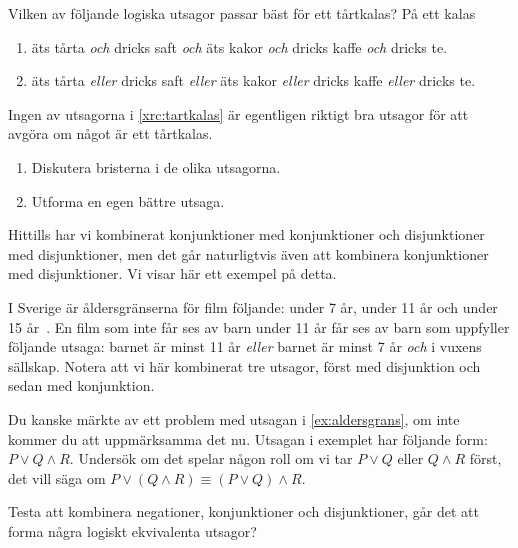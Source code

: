 \begin{exercise}\label{xrc:tartkalas}
  Vilken av följande logiska utsagor passar bäst för ett tårtkalas?
  På ett kalas
  \begin{enumerate}
    \item äts tårta \emph{och} dricks saft \emph{och} äts kakor
      \emph{och} dricks kaffe \emph{och} dricks te.
    \item äts tårta \emph{eller} dricks saft \emph{eller} äts kakor
      \emph{eller} dricks kaffe \emph{eller} dricks te.
  \end{enumerate}
\end{exercise}

\begin{exercise}
  Ingen av utsagorna i \cref{xrc:tartkalas} är egentligen riktigt bra 
  utsagor för att avgöra om något är ett tårtkalas.
  \begin{enumerate}
    \item Diskutera bristerna i de olika utsagorna.
    \item Utforma en egen bättre utsaga.
  \end{enumerate}
\end{exercise}

Hittills har vi kombinerat konjunktioner med konjunktioner och disjunktioner 
med disjunktioner, men det går naturligtvis även att kombinera konjunktioner 
med disjunktioner.
Vi visar här ett exempel på detta.

\begin{example}\label{ex:aldersgrans}
  I Sverige är åldersgränserna för film följande: under 7 år, under 11 år och 
  under 15 år~\cite{aldersgranser}.
  En film som inte får ses av barn under 11 år får ses av barn som uppfyller 
  följande utsaga: barnet är minst 11 år \emph{eller} barnet är minst 7 år 
  \emph{och} i vuxens sällskap.
  Notera att vi här kombinerat tre utsagor, först med disjunktion och sedan med 
  konjunktion.
\end{example}

\begin{exercise}
  Du kanske märkte av ett problem med utsagan i \cref{ex:aldersgrans}, om 
  inte kommer du att uppmärksamma det nu.
  Utsagan i exemplet har följande form: \(P\lor Q\land R\).
  Undersök om det spelar någon roll om vi tar \(P\lor Q\) eller \(Q\land R\) 
  först, det vill säga om \(P\lor (Q\land R)\equiv (P\lor Q)\land R\).
\end{exercise}

\begin{exercise}
  Testa att kombinera negationer, konjunktioner och disjunktioner, går det
  att forma några logiskt ekvivalenta utsagor?
\end{exercise}

